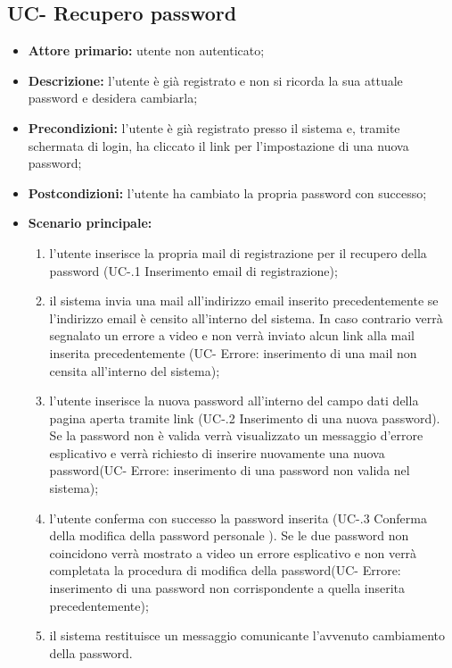\subsection{UC- Recupero password}
\begin{itemize}
	\item \textbf{Attore primario:} utente non autenticato;

	\item \textbf{Descrizione:} l'utente è già registrato e non si ricorda la sua attuale password e desidera cambiarla;

	\item \textbf{Precondizioni:} l'utente è già registrato presso il sistema e, tramite schermata di login, ha cliccato il link per l'impostazione di una nuova password;

	\item \textbf{Postcondizioni:} l'utente ha cambiato la propria password con successo;

	\item \textbf{Scenario principale:}
	      \begin{enumerate}
	      	      \item l'utente inserisce la propria mail di registrazione per il recupero della password (UC-.1 Inserimento email di registrazione);
		      \item il sistema invia una mail all'indirizzo email inserito precedentemente se l'indirizzo email è censito all'interno del sistema. In caso contrario verrà segnalato un errore a video e non verrà inviato alcun link alla 			      mail inserita precedentemente (UC- Errore: inserimento di una mail non censita all'interno del sistema);
		      \item l'utente inserisce la nuova password all'interno del campo dati della pagina aperta tramite link (UC-.2 Inserimento di una nuova password). Se la password non è valida verrà visualizzato un messaggio d'errore esplicativo e verrà richiesto di inserire nuovamente una nuova password(UC- Errore: inserimento di una password non valida nel sistema);
		      \item l'utente conferma con successo la password inserita (UC-.3 Conferma della modifica della password personale ). Se le due password non coincidono verrà mostrato a video un errore esplicativo e non verrà completata la procedura di modifica della password(UC- Errore: inserimento di una password non corrispondente a quella inserita precedentemente);
		      \item il sistema restituisce un messaggio comunicante l'avvenuto cambiamento della password.
	      \end{enumerate}
\end{itemize}


